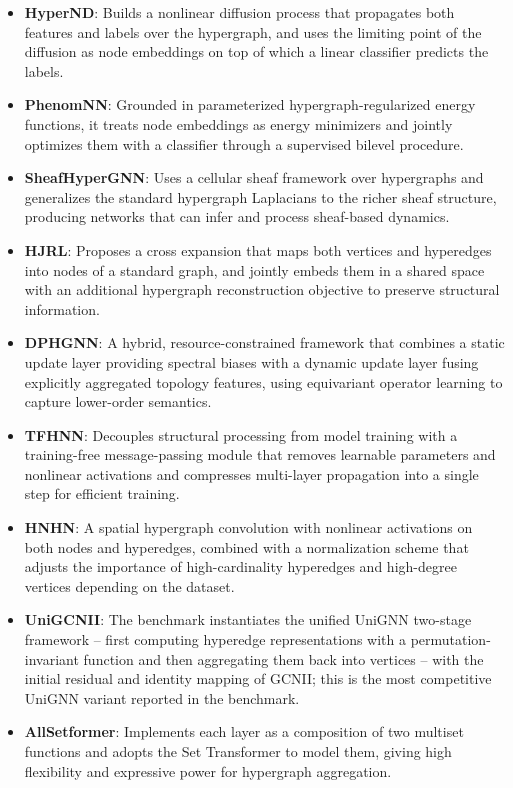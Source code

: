\documentclass[11pt,a4paper]{article}
\begin{document}
\begin{itemize}
\item \textbf{HyperND}\cite{prokopchik2022hypernd}: Builds a nonlinear diffusion process that propagates both features and labels over the hypergraph, and uses the limiting point of the diffusion as node embeddings on top of which a linear classifier predicts the labels.
\item \textbf{PhenomNN}\cite{wang2023phenomnn}: Grounded in parameterized hypergraph-regularized energy functions, it treats node embeddings as energy minimizers and jointly optimizes them with a classifier through a supervised bilevel procedure.
\item \textbf{SheafHyperGNN}\cite{duta2023sheaf}: Uses a cellular sheaf framework over hypergraphs and generalizes the standard hypergraph Laplacians to the richer sheaf structure, producing networks that can infer and process sheaf-based dynamics.
\item \textbf{HJRL}\cite{yan2024hjrl}: Proposes a cross expansion that maps both vertices and hyperedges into nodes of a standard graph, and jointly embeds them in a shared space with an additional hypergraph reconstruction objective to preserve structural information.
\item \textbf{DPHGNN}\cite{saxena2024dphgnn}: A hybrid, resource-constrained framework that combines a static update layer providing spectral biases with a dynamic update layer fusing explicitly aggregated topology features, using equivariant operator learning to capture lower-order semantics.
\item \textbf{TFHNN}\cite{tang2025tfhnn}: Decouples structural processing from model training with a training-free message-passing module that removes learnable parameters and nonlinear activations and compresses multi-layer propagation into a single step for efficient training.
\item \textbf{HNHN}\cite{dong2020hnhn}: A spatial hypergraph convolution with nonlinear activations on both nodes and hyperedges, combined with a normalization scheme that adjusts the importance of high-cardinality hyperedges and high-degree vertices depending on the dataset.
\item \textbf{UniGCNII}\cite{huang2021unignn}: The benchmark instantiates the unified UniGNN two-stage framework -- first computing hyperedge representations with a permutation-invariant function and then aggregating them back into vertices -- with the initial residual and identity mapping of GCNII; this is the most competitive UniGNN variant reported in the benchmark.
\item \textbf{AllSetformer}\cite{chien2022allset}: Implements each layer as a composition of two multiset functions and adopts the Set Transformer to model them, giving high flexibility and expressive power for hypergraph aggregation.

\end{itemize}
\end{document}
